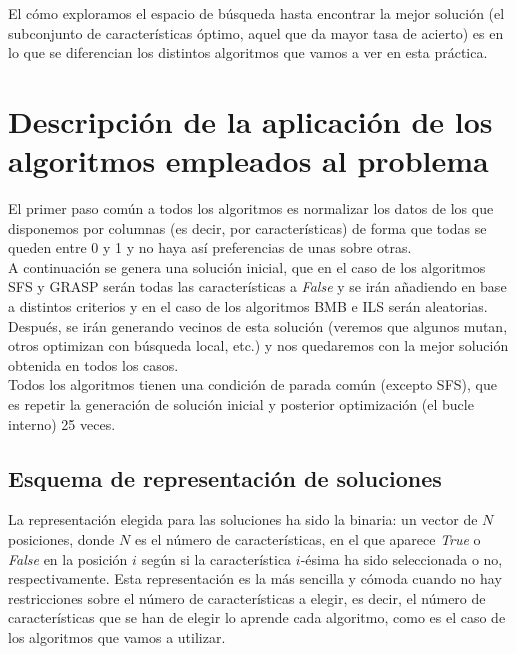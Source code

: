 \documentclass[12pt]{article}
\begin{document}
El cómo exploramos el espacio de búsqueda hasta encontrar la mejor solución (el subconjunto de características óptimo, aquel que da mayor tasa de acierto) es en lo que se diferencian los distintos algoritmos que vamos a ver en esta práctica.

\newpage

\section{Descripción de la aplicación de los algoritmos empleados al problema}
El primer paso común a todos los algoritmos es normalizar los datos de los que disponemos por columnas (es decir, por características) de forma que todas se queden entre 0 y 1 y no haya así preferencias de unas sobre otras.\\

A continuación se genera una solución inicial, que en el caso de los algoritmos SFS y GRASP serán todas las características a \textit{False} y se irán añadiendo en base a distintos criterios y en el caso de los algoritmos BMB e ILS serán aleatorias. Después, se irán generando vecinos de esta solución (veremos que algunos mutan, otros optimizan con búsqueda local, etc.) y nos quedaremos con la mejor solución obtenida en todos los casos.\\

Todos los algoritmos tienen una condición de parada común (excepto SFS), que es repetir la generación de solución inicial y posterior optimización (el bucle interno) 25 veces.

\subsection{Esquema de representación de soluciones}
La representación elegida para las soluciones ha sido la binaria: un vector de $N$ posiciones, donde $N$ es el número de características, en el que aparece \textit{True} o \textit{False} en la posición $i$ según si la característica $i$-ésima ha sido seleccionada o no, respectivamente. Esta representación es la más sencilla y cómoda cuando no hay restricciones sobre el número de características a elegir, es decir, el número de características que se han de elegir lo aprende cada algoritmo, como es el caso de los algoritmos que vamos a utilizar.
\end{document}
